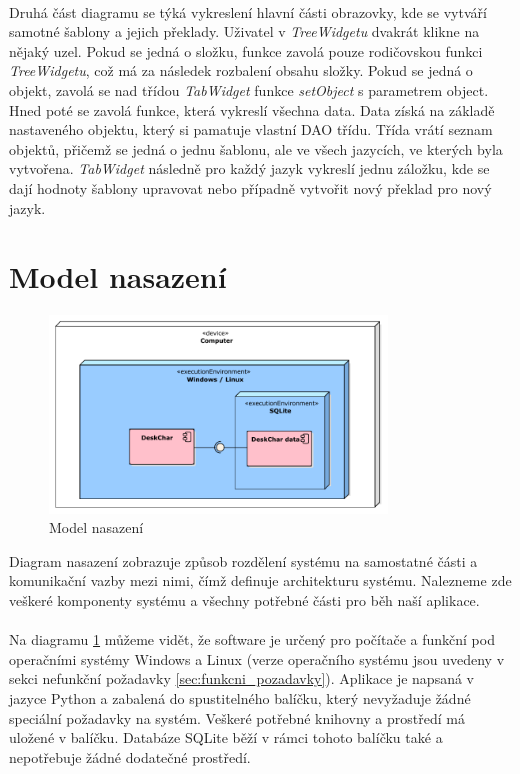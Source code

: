 \documentclass[thesis=B,czech]{resources/FITthesis}[2012/06/26]
\begin{document}
\\
Druhá část diagramu se týká vykreslení hlavní části obrazovky, kde se vytváří samotné šablony a jejich překlady. Uživatel v \textit{TreeWidgetu} dvakrát klikne na nějaký uzel. Pokud se jedná o složku, funkce zavolá pouze rodičovskou funkci \textit{TreeWidgetu}, což má za následek rozbalení obsahu složky. Pokud se jedná o objekt, zavolá se nad třídou \textit{TabWidget} funkce \textit{setObject} s parametrem object. Hned poté se zavolá funkce, která vykreslí všechna data. Data získá na základě nastaveného objektu, který si pamatuje vlastní DAO třídu. Třída vrátí seznam objektů, přičemž se jedná o jednu šablonu, ale ve všech jazycích, ve kterých byla vytvořena. \textit{TabWidget} následně pro každý jazyk vykreslí jednu záložku, kde se dají hodnoty šablony upravovat nebo případně vytvořit nový překlad pro nový jazyk.
	
	\section{Model nasazení}
	\begin{figure}\centering
	\includegraphics[width=0.8\textwidth]{images/model_nasazeni}
	\caption[Model nasazení]{Model nasazení}\label{fig:model_nasazeni}
	\end{figure}
Diagram nasazení zobrazuje způsob rozdělení systému na samostatné části a komunikační vazby mezi nimi, čímž definuje architekturu systému. Nalezneme zde veškeré komponenty systému a všechny potřebné části pro běh naší aplikace.\\
\\
Na diagramu \ref{fig:model_nasazeni} můžeme vidět, že software je určený pro počítače a funkční pod operačními systémy Windows a Linux (verze operačního systému jsou uvedeny v sekci nefunkční požadavky \ref{sec:funkcni_pozadavky}). Aplikace je napsaná v jazyce Python a zabalená do spustitelného balíčku, který nevyžaduje žádné speciální požadavky na systém. Veškeré potřebné knihovny a prostředí má uložené v balíčku. Databáze SQLite běží v rámci tohoto balíčku také a nepotřebuje žádné dodatečné prostředí.
\end{document}
